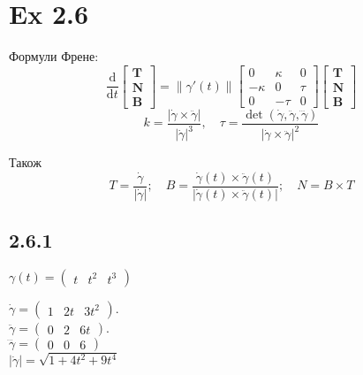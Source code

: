 \documentclass[10pt, a4paper]{article} %
\begin{document}
\section*{Ex 2.6}

Формули Френе:
\[{\displaystyle {\frac {\mathrm {d} }{\mathrm {d} t}}{\begin{bmatrix}\mathbf {T} \\\mathbf {N} \\\mathbf {B} \end{bmatrix}}=\|\gamma'(t)\|{\begin{bmatrix}0&\kappa &0\\-\kappa &0&\tau \\0&-\tau &0\end{bmatrix}}{\begin{bmatrix}\mathbf {T} \\\mathbf {N} \\\mathbf {B} \end{bmatrix}}}\]
\[k = \frac{|\dot\gamma \times \ddot\gamma|}{|\dot\gamma|^3}, \quad \tau = \frac{\det(\dot\gamma, \ddot\gamma, \dddot\gamma)}{|\dot\gamma \times \ddot\gamma|^2}\]

Також
\[
T = \frac{\dot\gamma}{|\dot\gamma|}; \quad
B = \frac{\dot\gamma(t) \times \ddot\gamma(t)}{|\dot\gamma(t) \times \ddot\gamma(t)|}; \quad
N = B \times T
\]

\subsection*{2.6.1}
\begin{mdframed}
    $\gamma(t) = \begin{pmatrix}
        t & t^2 & t^3
    \end{pmatrix}$
\end{mdframed}

$\dot\gamma = \begin{pmatrix}1 & 2t & 3t^2\end{pmatrix}$.\\
$\ddot\gamma = \begin{pmatrix}0 & 2 & 6t\end{pmatrix}$.\\
$\dddot\gamma = \begin{pmatrix}0 & 0 & 6\end{pmatrix}$\\
$|\dot\gamma| = \sqrt{1+4t^2+9t^4}$
\end{document}
